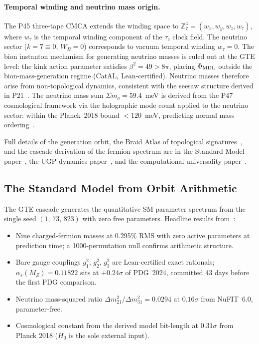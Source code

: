\paragraph{Temporal winding and neutrino mass origin.}
The P45 three-tape CMCA extends the winding space to
$\mathbb{Z}_7^4 = (w_x, w_y, w_z, w_\tau)$, where $w_\tau$ is the temporal
winding component of the $\tau_c$ clock field.  The neutrino sector
($k = 7 \equiv 0$, $W_B = 0$) corresponds to vacuum temporal winding $w_\tau = 0$.
The bion instanton mechanism for generating neutrino masses is ruled out at the
GTE level: the kink action parameter satisfies $\beta^2 = 49 > 8\pi$, placing
$\Phi_{\rm MDL}$ outside the bion-mass-generation regime (CatAL, Lean-certified).
Neutrino masses therefore arise from non-topological dynamics, consistent with the
seesaw structure derived in P21~\cite{SpivackNeutrino}.
The neutrino mass sum $\Sigma m_\nu = 59.4$~meV is derived from the P47 cosmological
framework via the holographic mode count applied to the neutrino sector: within the
Planck~2018 bound $< 120$~meV, predicting normal mass ordering~\cite{SpivackGTECosmology}.

Full details of the generation orbit, the Braid Atlas of topological signatures~\cite{SpivackBraidAtlas},
and the cascade derivation of the fermion spectrum are in the Standard Model
paper~\cite{SpivackSM}, the UGP dynamics paper~\cite{Spivack2026_UGPDynamics}, and
the computational universality paper~\cite{SpivackCompUniversality}.

\subsection{The Standard Model from Orbit Arithmetic}
\label{subsec:overview-sm}

The GTE cascade generates the quantitative SM parameter spectrum from the single
seed $(1,\,73,\,823)$ with zero free parameters.  Headline results
from~\cite{SpivackSM}:

\begin{itemize}[leftmargin=1.5em,itemsep=0.25em]
  \item Nine charged-fermion masses at 0.295\% RMS with zero active parameters at
    prediction time; a 1000-permutation null confirms arithmetic structure.
  \item Bare gauge couplings $g_1^2,\, g_2^2,\, g_3^2$ are Lean-certified exact
    rationals; $\alpha_s(M_Z) = 0.11822$ sits at $+0.24\sigma$ of PDG~2024, committed
    43 days before the first PDG comparison.
  \item Neutrino mass-squared ratio $\Delta m^2_{21}/\Delta m^2_{31} = 0.0294$ at
    $0.16\sigma$ from NuFIT~6.0, parameter-free.
  \item Cosmological constant from the derived model bit-length at $0.31\sigma$ from
    Planck 2018 ($H_0$ is the sole external input).
\end{itemize}

